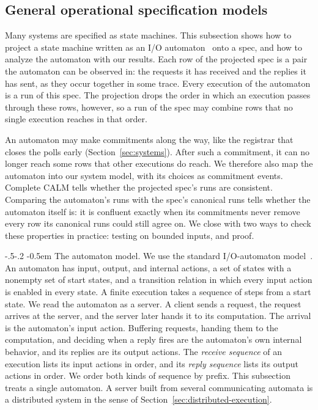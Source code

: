\documentclass[sigconf]{cidr-2027}
\makeatletter
\theoremstyle{remark}
\renewcommand\paragraph{\@startsection{paragraph}{4}{\z@}%
  {-.5\baselineskip \@plus -2\p@ \@minus -.2\p@}%
  {-0.5em}%
  {\normalfont\bfseries}}
\newcommand{\commitment}{commitment\xspace}
\newcommand{\commitments}{commitments\xspace}
\makeatother
\begin{document}
\subsection{General operational specification models}
\label{sec:operational-models}
Many systems are specified as state machines. This subsection shows how to
project a state machine written as an I/O automaton~\cite{lynch1987io} onto a
spec, and how to analyze the automaton with our results. Each row of the
projected spec is a pair the automaton can be observed in: the requests it has
received and the replies it has sent, as they occur together in some trace. Every execution of the automaton is a run of this spec. The projection drops
the order in which an execution passes through these rows, however, so a run of
the spec may combine rows that no single execution reaches in that order.

An automaton may make \commitments along the way, like the registrar that closes
the polls early (Section~\ref{sec:systems}). After such a \commitment, it can
no longer reach some rows that other executions do reach. We therefore also
map the automaton into our system model, with its choices as \commitment
events. Complete CALM tells whether the projected spec's runs are consistent. Comparing the automaton's runs with the spec's canonical runs tells whether the
automaton itself is: it is confluent exactly when its \commitments never remove
every row its canonical runs could still agree on. We close with two ways to
check these properties in practice: testing on bounded inputs, and proof.

\paragraph{The automaton model.}
We use the standard I/O-automaton
model~\cite{lynch1987io,lynch1996distributed}. An automaton has input, output,
and internal actions, a set of states with a nonempty set of start states, and
a transition relation in which every input action is enabled in every state. A finite execution takes a sequence of steps from a start state. We read the
automaton as a server. A client sends a request, the request arrives at the
server, and the server later hands it to its computation. The arrival is the
automaton's input action. Buffering requests, handing them to the computation,
and deciding when a reply fires are the automaton's own internal behavior, and
its replies are its output actions. The \emph{receive sequence} of an
execution lists its input actions in order, and its \emph{reply sequence} lists
its output actions in order. We order both kinds of sequence by prefix. This
subsection treats a single automaton. A server built from several
communicating automata is a distributed system in the sense of
Section~\ref{sec:distributed-execution}.
\end{document}
